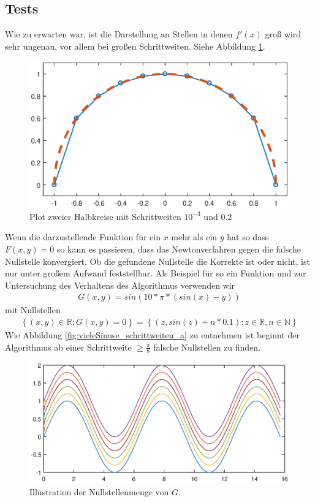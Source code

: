 \documentclass[a4paper,11pt,bibliography=totoc,listof=totoc,headinclude=true,cleardoublepage=empty,oneside]{scrartcl}
\begin{document}
\subsection{Tests}
Wie zu erwarten war, ist die Darstellung an Stellen in denen $f'(x)$ groß wird sehr ungenau, vor allem bei großen Schrittweiten. Siehe Abbildung \ref{fig:Halbkreis_a}.
\begin{figure}[h]
\centering
\includegraphics[width=0.85\linewidth]{plots/A/Halbkreis.eps}
\caption{Plot zweier Halbkreise mit Schrittweiten $10^{-3}$ und $0.2$}
\label{fig:Halbkreis_a}
\end{figure}
Wenn die darzustellende Funktion für ein $x$ mehr als ein $y$ hat so dass $F(x,y)=0$ so kann es passieren, dass das Newtonverfahren gegen die falsche Nullstelle konvergiert. Ob die gefundene Nullstelle die Korrekte ist oder nicht, ist nur unter großem Aufwand feststellbar. Als Beispiel für so ein Funktion und zur Untersuchung des Verhaltens des Algorithmus verwenden wir
\begin{align*}
G(x,y) = sin(10*\pi*(sin(x)-y))
\end{align*}
mit Nullstellen
\begin{align*}
\left\lbrace (x,y)\in\mathbb{R}: G(x,y)=0 \right\rbrace = \left\lbrace (z, sin(z)+n*0.1): z \in \mathbb{R}, n \in \mathbb{N} \right\rbrace
\end{align*}
Wie Abbildung \ref{fig:vieleSinuse_schrittweiten_a} zu entnehmen ist beginnt der Algorithmus ab einer Schrittweite $\geq \frac{\pi}{8}$ falsche Nullstellen zu finden.
\begin{figure}[h]
\centering
\includegraphics[width=0.85\linewidth]{plots/A/vieleSinuse.eps}
\caption{Illustration der Nullstellenmenge von $G$.}
\label{fig:vieleSinuse_a}
\end{figure}
\end{document}
